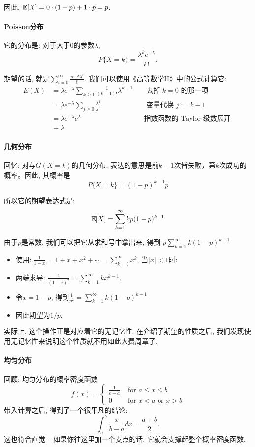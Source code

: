     因此, $ \mathbb E[X]=0 \cdot(1-p)+1 \cdot p=p$.

    \paragraph{Poisson分布} 它的分布是: 对于大于0的参数$\lambda$, $$
    P\{X=k\}=\frac{\lambda^k e^{-\lambda}}{k !}. 
    $$    

    期望的话, 就是$\sum_{i=0}^{\infty} \frac{i e^{-\lambda} \lambda^i}{i !}$. 我们可以使用《高等数学II》中的公式计算它: 
    $$
\begin{aligned}
{E}(X) & =\lambda e^{-\lambda} \sum_{k \geq 1} \frac{1}{(k-1) !} \lambda^{k-1} & & \text { 去掉 } k=0 \text { 的那一项 } \\
& =\lambda e^{-\lambda} \sum_{j \geq 0} \frac{\lambda^j}{j !} & & \text { 变量代换 } j:=k-1 \\
& =\lambda e^{-\lambda} e^\lambda & & \text {指数函数的 Taylor 级数展开 } \\
& =\lambda & &
\end{aligned}
$$

\paragraph{几何分布}
回忆: 对与$G(X=k)$的几何分布, 表达的意思是前$k-1$次皆失败，第$k$次成功的概率。因此, 其概率是
    $$
    P\{X=k\}=(1-p)^{k-1} p
    $$

    所以它的期望表达式是: 
    $$
    \mathbb E[X]=\sum_{k=1}^{\infty} k p(1-p)^{k-1}
    $$

    由于$p$是常数, 我们可以把它从求和号中拿出来, 得到
    $p \sum_{k=1}^{\infty} k(1-p)^{k-1}$


\begin{itemize}
    \item 使用: $\frac{1}{1-x}  =1+x+x^2+\cdots =\sum_{k=0}^{\infty} x^k$, 当$|x|<1$时: 
    \item 两端求导: $\frac{1}{(1-x)^2}=\sum_{k=1}^{\infty} k x^{k-1}$.
    \item 令$x=1-p$, 得到$\frac{1}{p^2}=\sum_{k=1}^{\infty} k(1-p)^{k-1}$
    \item 因此期望为$1/p$.
\end{itemize}

实际上, 这个操作正是对应着它的无记忆性. 在介绍了期望的性质之后, 我们发现使用无记忆性来说明这个性质就不用如此大费周章了. 

\paragraph{均匀分布} 回顾: 均匀分布的概率密度函数$$
f(x)= \begin{cases}\frac{1}{b-a} & \text { for } a \leq x \leq b \\ 0 & \text { for } x<a \text { or } x>b\end{cases}
$$
带入计算之后, 得到了一个很平凡的结论: $$\int_a^b \frac{x}{b-a} d x=\frac{a+b}{2}.$$
这也符合直觉 -- 如果你往这里加一个支点的话, 它就会支撑起整个概率密度函数. 

